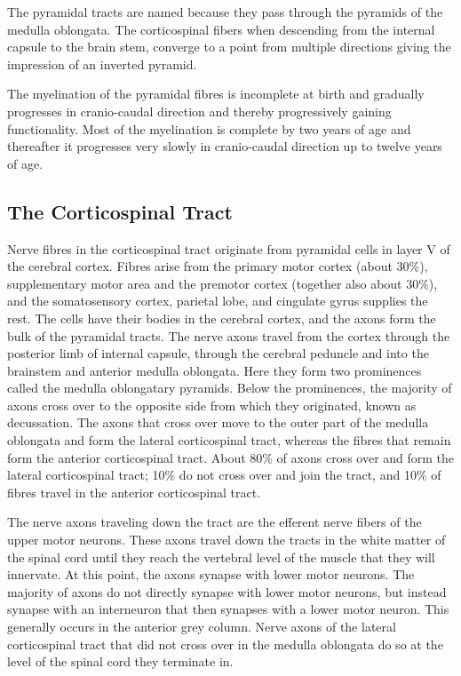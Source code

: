 The pyramidal tracts are named because they pass through the pyramids of the medulla oblongata. The corticospinal fibers when descending from the internal capsule to the brain stem, converge to a point from multiple directions giving the impression of an inverted pyramid.

The myelination of the pyramidal fibres is incomplete at birth and gradually progresses in cranio-caudal direction and thereby progressively gaining functionality. Most of the myelination is complete by two years of age and thereafter it progresses very slowly in cranio-caudal direction up to twelve years of age.

\hypertarget{the-corticospinal-tract-1}{%
\subsection{The Corticospinal Tract}\label{the-corticospinal-tract-1}}

Nerve fibres in the corticospinal tract originate from pyramidal cells in layer V of the cerebral cortex. Fibres arise from the primary motor cortex (about 30\%), supplementary motor area and the premotor cortex (together also about 30\%), and the somatosensory cortex, parietal lobe, and cingulate gyrus supplies the rest. The cells have their bodies in the cerebral cortex, and the axons form the bulk of the pyramidal tracts. The nerve axons travel from the cortex through the posterior limb of internal capsule, through the cerebral peduncle and into the brainstem and anterior medulla oblongata. Here they form two prominences called the medulla oblongatary pyramids. Below the prominences, the majority of axons cross over to the opposite side from which they originated, known as decussation. The axons that cross over move to the outer part of the medulla oblongata and form the lateral corticospinal tract, whereas the fibres that remain form the anterior corticospinal tract. About 80\% of axons cross over and form the lateral corticospinal tract; 10\% do not cross over and join the tract, and 10\% of fibres travel in the anterior corticospinal tract.

The nerve axons traveling down the tract are the efferent nerve fibers of the upper motor neurons. These axons travel down the tracts in the white matter of the spinal cord until they reach the vertebral level of the muscle that they will innervate. At this point, the axons synapse with lower motor neurons. The majority of axons do not directly synapse with lower motor neurons, but instead synapse with an interneuron that then synapses with a lower motor neuron. This generally occurs in the anterior grey column. Nerve axons of the lateral corticospinal tract that did not cross over in the medulla oblongata do so at the level of the spinal cord they terminate in.

